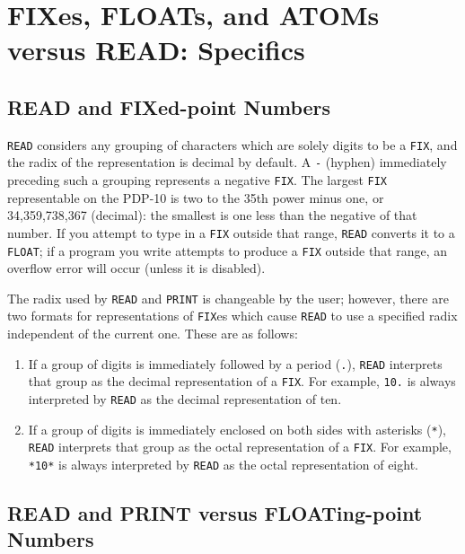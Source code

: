 \documentclass[a4paper]{scrbook}
\begin{document}
\section{FIXes, FLOATs, and ATOMs versus READ: Specifics}\label{fixes-floats-and-atoms-versus-read-specifics}

\subsection{READ and FIXed-point Numbers}\label{read-and-fixed-point-numbers}

\texttt{READ} considers any grouping of characters which are solely digits to be a
\texttt{FIX}, and the radix of the representation is decimal by default. A \texttt{-} (hyphen)
immediately preceding such a grouping represents a negative \texttt{FIX}. The largest \texttt{FIX} representable on the
PDP-10 is two to the 35th power minus one, or 34,359,738,367 (decimal): the smallest is one less than the negative of that
number. If you attempt to type in a \texttt{FIX} outside that range, \texttt{READ} converts it to a \texttt{FLOAT}; if a
program you write attempts to produce a \texttt{FIX} outside that range, an overflow error will occur (unless it is
disabled).

The radix used by \texttt{READ} and \texttt{PRINT} is changeable by the user; however, there are two formats for
representations of \texttt{FIX}es which cause \texttt{READ} to use a specified radix independent of the current one. These
are as follows:

\begin{enumerate}
\def\labelenumi{\arabic{enumi}.}
\item
  If a group of digits is immediately followed by a period (\texttt{.}), \texttt{READ} interprets
  that group as the decimal representation of a \texttt{FIX}. For example, \texttt{10.} is always interpreted by
  \texttt{READ} as the decimal representation of ten.
\item
  If a group of digits is immediately enclosed on both sides with asterisks (\texttt{*}), 
  \texttt{READ} interprets that group as the octal representation of a \texttt{FIX}. For example, \texttt{*10*} is always
  interpreted by \texttt{READ} as the octal representation of eight.
\end{enumerate}

\subsection{READ and PRINT versus FLOATing-point Numbers}\label{read-and-print-versus-floating-point-numbers}
\end{document}
